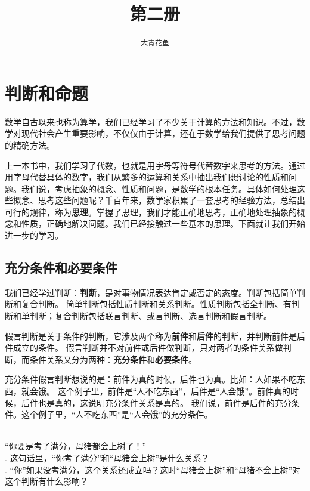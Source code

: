 \documentclass[12pt,UTF8]{ctexbook}
\title{\zihao{0} \bfseries 第二册}
\author{\zihao{2} \texttt{大青花鱼}}
\date{}
\begin{document}
\maketitle
\tableofcontents
\newpage

\chapter{判断和命题}

数学自古以来也称为算学，我们已经学习了不少关于计算的方法和知识。不过，数学对现代社会产生重要影响，不仅仅由于计算，还在于数学给我们提供了思考问题的精确方法。

上一本书中，我们学习了代数，也就是用字母等符号代替数字来思考的方法。通过用字母代替具体的数字，我们从繁多的运算和关系中抽出我们想讨论的性质和问题。我们说，考虑抽象的概念、性质和问题，是数学的根本任务。具体如何处理这些概念、思考这些问题呢？千百年来，数学家积累了一套思考的经验方法，总结出可行的规律，称为\textbf{思理}。掌握了思理，我们才能正确地思考，正确地处理抽象的概念和性质，正确地解决问题。我们已经接触过一些基本的思理。下面就让我们开始进一步的学习。

\section{充分条件和必要条件}
我们已经学过判断：\textbf{判断}，是对事物情况表达肯定或否定的态度。判断包括简单判断和复合判断。
简单判断包括性质判断和关系判断。性质判断包括全判断、有判断和单判断；复合判断包括联言判断、或言判断、选言判断和假言判断。

假言判断是关于条件的判断，它涉及两个称为\textbf{前件}和\textbf{后件}的判断，并判断前件是后件成立的条件。
假言判断并不对前件或后件做判断，只对两者的条件关系做判断，而条件关系又分为两种：\textbf{充分条件}和\textbf{必要条件}。

充分条件假言判断想说的是：前件为真的时候，后件也为真。比如：人如果不吃东西，就会饿。
这个例子里，前件是“人不吃东西”，后件是“人会饿”。前件真的时候，后件也是真的，这说明充分条件关系是真的。
我们说，前件是后件的充分条件。这个例子里，“人不吃东西”是“人会饿”的充分条件。

\begin{et}\label{et:2-0-0}
    \mbox{}\\
    \indent “你要是考了满分，母猪都会上树了！”\\
    . 这句话里，“你考了满分”和“母猪会上树”是什么关系？\\
    . “你”如果没考满分，这个关系还成立吗？这时“母猪会上树”和“母猪不会上树”对这个判断有什么影响？
\end{et}
\end{document}
